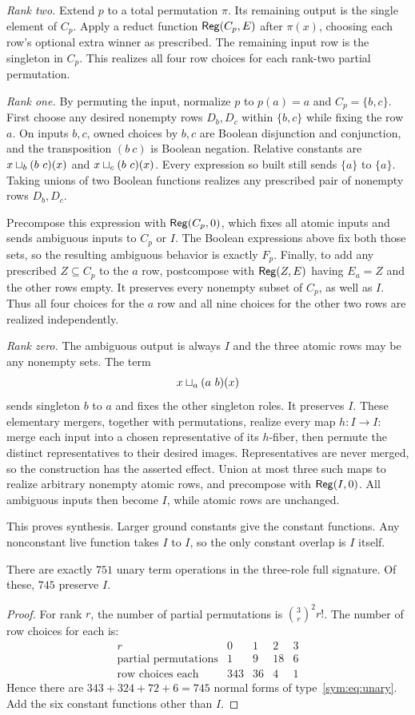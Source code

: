 \emph{Rank two.} Extend $p$ to a total permutation $\pi$. Its remaining
output is the single element of $C_p$. Apply a reduct function $\mathsf{Reg}(C_p,E)$
after $\pi(x)$, choosing each row's optional extra winner as prescribed.
The remaining input row is the singleton in $C_p$. This realizes all
four row choices for each rank-two partial permutation.

\emph{Rank one.} By permuting the input, normalize $p$ to $p(a)=a$ and
$C_p=\{b,c\}$. First choose any desired nonempty rows $D_b,D_c$ within
$\{b,c\}$ while fixing the row $a$. On inputs $b,c$, owned choices by
$b,c$ are Boolean disjunction and conjunction, and the transposition
$(b\ c)$ is Boolean negation. Relative constants are
$x\mathbin{\sqcup_{b}}(b\ c)(x)$ and $x\mathbin{\sqcup_{c}}(b\ c)(x)$. Every expression so built
still sends $\{a\}$ to $\{a\}$. Taking unions of two Boolean functions
realizes any prescribed pair of nonempty rows $D_b,D_c$.

Precompose this expression with $\mathsf{Reg}(C_p,0)$, which fixes all atomic inputs
and sends ambiguous inputs to $C_p$ or $I$. The Boolean expressions
above fix both those sets, so the resulting ambiguous behavior is
exactly $F_p$. Finally, to add any prescribed $Z\subseteq C_p$ to the
$a$ row, postcompose with $\mathsf{Reg}(Z,E)$ having $E_a=Z$ and the other rows
empty. It preserves every nonempty subset of $C_p$, as well as $I$.
Thus all four choices for the $a$ row and all nine choices for the other
two rows are realized independently.

\emph{Rank zero.} The ambiguous output is always $I$ and the three
atomic rows may be any nonempty sets. The term
\[
 x\mathbin{\sqcup_{a}}(a\ b)(x)
\]
sends singleton $b$ to $a$ and fixes the other singleton roles. It
preserves $I$. These elementary mergers, together with permutations,
realize every map $h:I\to I$: merge each input into a chosen
representative of its $h$-fiber, then permute the distinct representatives
to their desired images. Representatives are never merged, so the
construction has the asserted effect. Union at most three such maps
to realize arbitrary nonempty atomic rows, and precompose with $\mathsf{Reg}(I,0)$.
All ambiguous inputs then become $I$, while atomic rows are unchanged.

This proves synthesis. Larger ground constants give the constant
functions. Any nonconstant live function takes $I$ to $I$, so the only
constant overlap is $I$ itself.

\begin{corollary}[Count]
There are exactly $751$ unary term operations in the three-role full
signature. Of these, $745$ preserve $I$.
\end{corollary}
\begin{proof}
For rank $r$, the number of partial permutations is
$\binom3r^2r!$. The number of row choices for each is:
\[
\begin{array}{c|rrrr}
 r&0&1&2&3\\\hline
 \text{partial permutations}&1&9&18&6\\
 \text{row choices each}&343&36&4&1
\end{array}
\]
Hence there are $343+324+72+6=745$ normal forms of
type~\eqref{sym:eq:unary}. Add the six constant functions other than $I$.
\end{proof}

